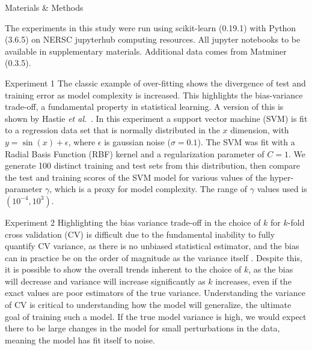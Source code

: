 \documentclass[onecolumn,abstract,paper=letter]{scrartcl}
\newcommand{\etal}{\textit{et al}.\ }
\begin{document}

\begin{section}{Materials \& Methods}

The experiments in this study were run using scikit-learn (0.19.1) with Python (3.6.5) on NERSC jupyterhub computing resources. All jupyter notebooks to be available in supplementary materials. 
Additional data comes from Matminer (0.3.5).

\begin{subsection}{Experiment 1}
The classic example of over-fitting shows the divergence of test and training error as model complexity is increased. 
This highlights the bias-variance trade-off, a fundamental property in statistical learning.
A version of this is shown by Hastie \etal \cite{hastie2009}.
In this experiment a support vector machine (SVM) is fit to a regression data set that is normally distributed in the $x$ dimension, with $y = \sin(x) + \epsilon$, where $\epsilon$ is gaussian noise ($\sigma=0.1$). 
The SVM was fit with a Radial Basis Function (RBF) kernel and a regularization parameter of $C=1$.
We generate 100 distinct training and test sets from this distribution, then compare the test and training scores of the SVM model for various values of the hyper-parameter $\gamma$, which is a proxy for model complexity.
The range of $\gamma$ values used is $(10^{-4}, 10^{3})$.
\end{subsection}

\begin{subsection}{Experiment 2}
Highlighting the bias variance trade-off in the choice of $k$ for $k$-fold cross validation (CV) is difficult due to the fundamental inability to fully quantify CV variance, as there is no unbiased statistical estimator, and the bias can in practice be on the order of magnitude as the variance itself \cite{bengio2004}.
Despite this, it is possible to show the overall trends inherent to the choice of $k$, as the bias will decrease and variance will increase significantly as $k$ increases, even if the exact values are poor estimators of the true variance. 
Understanding the variance of CV is critical to understanding how the model will generalize, the ultimate goal of training such a model.
If the true model variance is high, we would expect there to be large changes in the model for small perturbations in the data, meaning the model has fit itself to noise.


\end{subsection}
\end{section}
\end{document}
